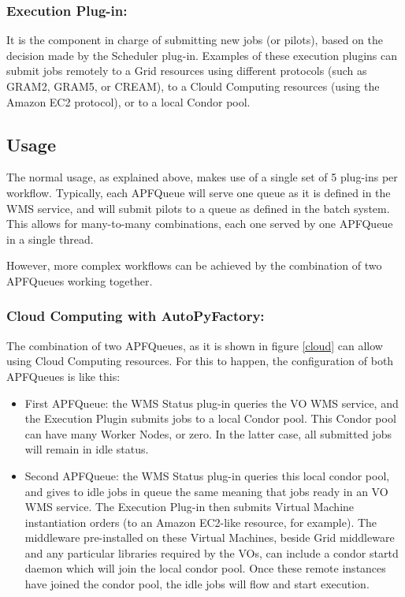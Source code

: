 \documentclass[a4paper]{jpconf}
\begin{document}
\subsubsection{Execution Plug-in:}
It is the component in charge of submitting new jobs (or pilots), 
based on the decision made by the Scheduler plug-in. 
Examples of these execution plugins can submit jobs remotely to a Grid resources using different protocols 
(such as GRAM2, GRAM5, or CREAM),
to a Clould Computing resources (using the Amazon EC2 protocol), 
or to a local Condor pool.


\subsection{Usage}

The normal usage, as explained above, 
makes use of a single set of 5 plug-ins per workflow. 
Typically, each APFQueue will serve one queue as it is defined in the WMS service, 
and will submit pilots to a queue as defined in the batch system. 
This allows for many-to-many combinations, each one served by one APFQueue in a single thread. 

However, more complex workflows can be achieved by the combination of two APFQueues working together.

\subsubsection{Cloud Computing with AutoPyFactory:}
The combination of two APFQueues, 
as it is shown in figure \ref{cloud}
can allow using Cloud Computing resources. 
For this to happen, the configuration of both APFQueues is like this:

\begin{itemize}
\item First APFQueue: 
the WMS Status plug-in queries the VO WMS service, and the Execution Plugin submits jobs  to a local Condor pool.
This Condor pool can have many Worker Nodes, or zero. 
In the latter case, all submitted jobs will remain in idle status. 
\item Second APFQueue: 
the WMS Status plug-in queries this local condor pool, 
and gives to idle jobs in queue the same meaning that jobs ready in an VO WMS service. 
The Execution Plug-in then submits Virtual Machine instantiation orders (to an Amazon EC2-like resource, for example). 
The middleware pre-installed on these Virtual Machines, 
beside Grid middleware and any particular libraries required by the VOs, 
can include a condor startd daemon which will join the local condor pool. 
Once these remote instances have joined the condor pool, 
the idle jobs will flow and start execution. 
\end{itemize}
\end{document}
